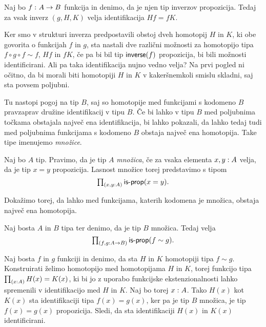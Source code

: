 \begin{trditev}
  \label{inv-prop-coherence}
  Naj bo \(f \,\colon A \to B\) funkcija in denimo, da je njen tip inverzov propozicija. Tedaj za vsak inverz \((g, H, K)\) velja identifikacija \(Hf = fK\).
\end{trditev}


Ker smo v strukturi inverza predpostavili obstoj dveh homotopij \(H\) in \(K\), ki obe govorita o funkcijah \(f\) in \(g\), sta nastali dve različni možnosti za homotopijo tipa \(f \circ g \circ f \sim f\), \(Hf\) in \(fK\), če pa bi bil tip \(\textnormal{\textsf{inverse}}(f)\) propozicija, bi bili možnosti identificirani. Ali pa taka identifikacija nujno vedno velja? Na prvi pogled ni očitno, da bi morali biti homotopiji \(H\) in \(K\) v kakeršnemkoli smislu skladni, saj sta povsem poljubni.

Tu nastopi pogoj na tip \(B\), saj so homotopije med funkcijami s kodomeno \(B\) pravzaprav družine identifikacij v tipu \(B\). Če bi lahko v tipu \(B\) med poljubnima točkama obstajala največ ena identifikacija, bi lahko pokazali, da lahko tedaj tudi med poljubnima funkcijama s kodomeno \(B\) obstaja največ ena homotopija. Take tipe imenujemo \emph{množice}.

\begin{definicija}
  Naj bo \(A\) tip. Pravimo, da je tip \(A\) \emph{množica}, če za vsaka elementa \({x, y : A}\) velja, da je tip \(x = y\) propozicija. Lasnost množice torej predstavimo s tipom \[\textstyle \prod_{\left( {x, y : A} \right)} \textnormal{\textsf{is-prop}}(x = y).\]
\end{definicija}

Dokažimo torej, da lahko med funkcijama, katerih kodomena je množica, obstaja največ ena homotopija.

\begin{trditev}
  \label{is-prop-htpy-set}
  Naj bosta \(A\) in \(B\) tipa ter denimo, da je tip \(B\) množica. Tedaj velja
  \[\textstyle \prod_{\left( {f, g : A \to B} \right)} \textnormal{\textsf{is-prop}}(f \sim g).\]
\end{trditev}

\begin{dokaz}
  Naj bosta \(f\) in \(g\) funkciji in denimo, da sta \(H\) in \(K\) homotopiji tipa \(f \sim g\). Konstruirati želimo homotopijo med homotopijama \(H\) in \(K\), torej funkcijo tipa
  \(\textstyle \prod_{\left( {x : A} \right)} H(x) = K(x)\), ki bi jo z uporabo funkcijske ekstenzionalnosti lahko spremenili v identifikacijo med \(H\) in \(K\). Naj bo torej \({x : A}\).
  Tako \(H(x)\) kot \(K(x)\) sta identifikaciji tipa \(f(x) = g(x)\), ker pa je tip \(B\) množica, je tip \(f(x) = g(x)\) propozicija. Sledi, da sta identifikaciji \(H(x)\) in \(K(x)\) identificirani.
\end{dokaz}

